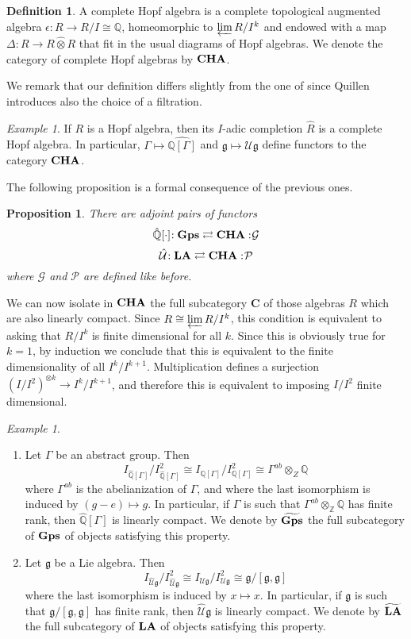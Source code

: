 \documentclass{amsart}
\newtheorem{prop}[thm]{Proposition}
\theoremstyle{definition}
\newtheorem{dfn}[thm]{Definition}
\theoremstyle{remark}
\theoremstyle{remark}
\newtheorem{example}[thm]{Example}
\newcommand{\Q}{\mathbb{Q}}
\newcommand{\Z}{\mathbb{Z}}
\newcommand{\cat}{\mathbf{C}}%
\newcommand{\ra}{\rightarrow}
\newcommand{\mcG}{\mathcal{G}}
\newcommand{\mcP}{\mathcal{P}}
\newcommand{\mcU}{\mathcal{U}}
\newcommand{\mfg}{\mathfrak{g}}
\newcommand{\adj}[4]{#1\negmedspace: #2\rightleftarrows #3:\negmedspace #4}
\DeclareMathOperator{\CHA}{\bf{CHA}}
\DeclareMathOperator{\Gps}{\bf{Gps}}
\DeclareMathOperator{\LA}{\bf{LA}}
\begin{document}
\begin{dfn}
A complete Hopf algebra is a complete topological augmented algebra $\epsilon\colon R\ra R/I\cong\Q$, homeomorphic to $\varprojlim R/I^k$ and endowed with a map $\Delta\colon R\ra R\hat{\otimes}R$ that fit in the usual diagrams of Hopf algebras.%
We denote the category of complete Hopf algebras by $\CHA$.
\end{dfn}

We remark that our definition differs slightly from the one of \cite{quillen-r} since Quillen introduces also the choice of a filtration.

\begin{example}
If $R$ is a Hopf algebra, then its $I$-adic completion $\hat{R}$ is a complete Hopf algebra. In particular, $\Gamma\mapsto \widehat{\Q[\Gamma]}$ and $\mfg\mapsto\widehat{\mcU\mfg}$ define functors to the category $\CHA$.
\end{example}

The following proposition is a formal consequence of the previous ones.

\begin{prop}
There are adjoint pairs of functors
\[
\adj{\hat{\Q}[\cdot]}{\Gps}{\CHA}{\mcG}
\]
\[
\adj{\hat{\mcU}}{\LA}{\CHA}{\mcP}
\]
where $\mcG$ and $\mcP$ are defined like before.
\end{prop}

We can now isolate in $\CHA$ the full subcategory $\cat$ of those algebras $R$ which are also linearly compact. Since $R\cong\varprojlim R/I^k$, this condition is equivalent to asking that $R/I^k$ is finite dimensional for all $k$. Since this is obviously true for $k=1$, by induction we conclude that this is equivalent to the finite dimensionality of all $I^k/I^{k+1}$. Multiplication defines a surjection $(I/I^2)^{\otimes k}\ra I^k/I^{k+1}$, and therefore this is equivalent to imposing $I/I^2$ finite dimensional.

\begin{example}
\begin{enumerate}
	\item Let $\Gamma$ be an abstract group. Then
	\[
	I_{\hat{\Q}[\Gamma]}/I_{\hat{\Q}[\Gamma]}^2\cong I_{{\Q}[\Gamma]}/I_{{\Q}[\Gamma]}^2\cong \Gamma^{ab}\otimes_Z\Q
	\]
	where $\Gamma^{ab}$ is the abelianization of $\Gamma$, and where the last isomorphism is induced by $(g-e)\mapsto g$. In particular, if $\Gamma$ is such that $\Gamma^{ab}\otimes_\Z\Q$ has finite rank, then $\hat{\Q}[\Gamma]$ is linearly compact. We denote by $\widetilde{\Gps}$ the full subcategory of $\Gps$ of objects satisfying this property.
	\item 
	Let $\mfg$ be a Lie algebra. Then
	\[
	I_{\hat{\mcU}\mfg}/I_{\hat{\mcU}\mfg}^2\cong I_{{\mcU}\mfg}/I_{{\mcU}\mfg}^2\cong \mfg/[\mfg,\mfg]
	\]
	where the last isomorphism is induced by $x\mapsto x$. In particular, if $\mfg$ is such that $\mfg/[\mfg,\mfg]$ has finite rank, then $\hat{\mcU}\mfg$ is linearly compact. We denote by $\widetilde{\LA}$ the full subcategory of $\LA$ of objects satisfying this property.
\end{enumerate}
\end{example}
\end{document}
